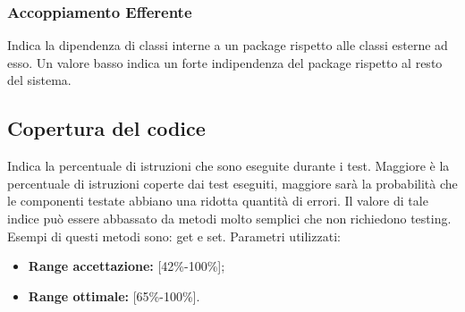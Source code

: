 \subsubsection{Accoppiamento Efferente}
Indica la dipendenza di classi interne a un package rispetto alle classi esterne ad esso.
Un valore basso indica un forte indipendenza del package rispetto al resto del sistema.

\subsection{Copertura del codice}
Indica la percentuale di istruzioni che sono eseguite durante i test.
Maggiore è la percentuale di istruzioni coperte dai test eseguiti, maggiore sarà la probabilità che le componenti testate abbiano una ridotta quantità di errori.
Il valore di tale indice può essere abbassato da metodi molto semplici che non richiedono
testing. Esempi di questi metodi sono: get e set.
Parametri utilizzati:

\begin{itemize}
	
	\item \textbf{Range accettazione:} [42\%-100\%];
	\item \textbf{Range ottimale:} [65\%-100\%].
	
\end{itemize}

